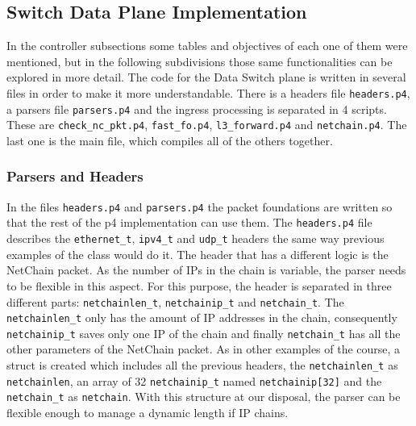 \documentclass[11pt,oneside,a4paper]{article}
\begin{document}
\subsection{Switch Data Plane Implementation}

In the controller subsections some tables and objectives of each one of them were mentioned, but in the following subdivisions those same functionalities can be explored in more detail.
The code for the Data Switch plane is written in several files in order to make it more understandable. There is a headers file {\color{red}\texttt{headers.p4}}, a parsers file {\color{red}\texttt{parsers.p4}} and the ingress processing is separated in 4 scripts. These are {\color{red}\texttt{check\_nc\_pkt.p4}}, {\color{red}\texttt{fast\_fo.p4}}, {\color{red}\texttt{l3\_forward.p4}} and {\color{red}\texttt{netchain.p4}}. The last one is the main file, which compiles all of the others together.

\subsubsection{Parsers and Headers}

In the files {\color{red}\texttt{headers.p4}} and {\color{red}\texttt{parsers.p4}} the packet foundations are written so that the rest of the p4 implementation can use them. The {\color{red}\texttt{headers.p4}} file describes the {\color{red}\texttt{ethernet\_t}}, {\color{red}\texttt{ipv4\_t}} and {\color{red}\texttt{udp\_t}} headers the same way previous examples of the class would do it. The header that has a different logic is the NetChain packet. As the number of IPs in the chain is variable, the parser needs to be flexible in this aspect. For this purpose, the header is separated in three different parts: {\color{red}\texttt{netchainlen\_t}}, {\color{red}\texttt{netchainip\_t}} and {\color{red}\texttt{netchain\_t}}. The {\color{red}\texttt{netchainlen\_t}} only has the amount of IP addresses in the chain, consequently {\color{red}\texttt{netchainip\_t}} saves only one IP of the chain and finally {\color{red}\texttt{netchain\_t}} has all the other parameters of the NetChain packet. As in other examples of the course, a struct is created which includes all the previous headers, the {\color{red}\texttt{netchainlen\_t}} as {\color{red}\texttt{netchainlen}}, an array of 32 {\color{red}\texttt{netchainip\_t}} named {\color{red}\texttt{netchainip[32]}} and the {\color{red}\texttt{netchain\_t}} as {\color{red}\texttt{netchain}}. With this structure at our disposal, the parser can be flexible enough to manage a dynamic length if IP chains. 
\end{document}
